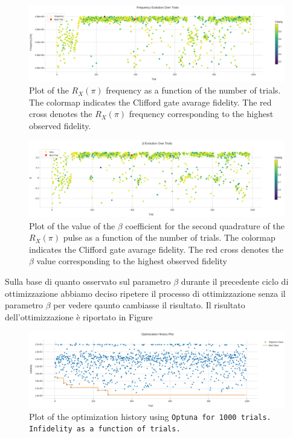 \begin{figure}[h!]
    \centering
    \includegraphics[width=\textwidth]{figures/png/RB_optimization/Optuna/1000beta/frequency.png}
    \caption{Plot of the $R_X(\pi)$ frequency as a function of the number of trials. 
    The colormap indicates the Clifford gate avarage fidelity.  
    The red cross denotes the $R_X(\pi)$ frequency corresponding to the highest observed fidelity.}
    \label{fig:optuna1000beta:frequency}
\end{figure}

\begin{figure}[h!]
    \centering
    \includegraphics[width=\textwidth]{figures/png/RB_optimization/Optuna/1000beta/beta.png}
    \caption{Plot of the value of the $\beta$ coefficient for the second quadrature of the $R_X(\pi)$ pulse as a function of the number of trials. 
    The colormap indicates the Clifford gate avarage fidelity.  
    The red cross denotes the $\beta$ value corresponding to the highest observed fidelity}
    \label{fig:optuna1000beta:beta}
\end{figure}


Sulla base di quanto osservato sul parametro $\beta$ durante il precedente ciclo di ottimizzazione abbiamo deciso ripetere il processo di ottimizzazione senza il parametro $\beta$ per vedere qaunto cambiasse il risultato.
Il risultato dell'ottimizzazione è riportato in Figure 
\begin{figure}[h!]
    \centering
    \includegraphics[width=\textwidth]{figures/png/RB_optimization/Optuna/1000/optimization.png}
    \caption{Plot of the optimization history using \tt{Optuna} for 1000 trials. Infidelity as a function of trials.}
    \label{fig:optuna1000:optimization}
\end{figure}

